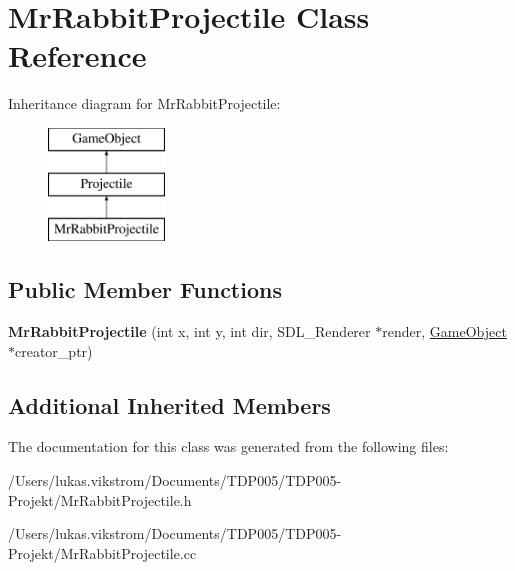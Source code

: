 \hypertarget{class_mr_rabbit_projectile}{}\section{Mr\+Rabbit\+Projectile Class Reference}
\label{class_mr_rabbit_projectile}
Inheritance diagram for Mr\+Rabbit\+Projectile\+:\begin{figure}[H]
\begin{center}
\leavevmode
\includegraphics[height=3.000000cm]{class_mr_rabbit_projectile}
\end{center}
\end{figure}
\subsection*{Public Member Functions}
\begin{DoxyCompactItemize}
\item 
\hypertarget{class_mr_rabbit_projectile_ac56afebb86e536ea16434b927c8a2662}{}{\bfseries Mr\+Rabbit\+Projectile} (int x, int y, int dir, S\+D\+L\+\_\+\+Renderer $\ast$render, \hyperlink{class_game_object}{Game\+Object} $\ast$creator\+\_\+ptr)\label{class_mr_rabbit_projectile_ac56afebb86e536ea16434b927c8a2662}

\end{DoxyCompactItemize}
\subsection*{Additional Inherited Members}


The documentation for this class was generated from the following files\+:\begin{DoxyCompactItemize}
\item 
/\+Users/lukas.\+vikstrom/\+Documents/\+T\+D\+P005/\+T\+D\+P005-\/\+Projekt/Mr\+Rabbit\+Projectile.\+h\item 
/\+Users/lukas.\+vikstrom/\+Documents/\+T\+D\+P005/\+T\+D\+P005-\/\+Projekt/Mr\+Rabbit\+Projectile.\+cc\end{DoxyCompactItemize}
